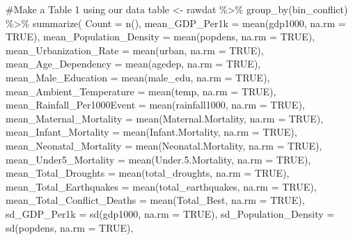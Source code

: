 \documentclass[
  letterpaper,
  DIV=11,
  numbers=noendperiod]{scrartcl}
\newenvironment{Shaded}{\begin{snugshade}}{\end{snugshade}}
\newcommand{\AttributeTok}[1]{\textcolor[rgb]{0.40,0.45,0.13}{#1}}
\newcommand{\CommentTok}[1]{\textcolor[rgb]{0.37,0.37,0.37}{#1}}
\newcommand{\ConstantTok}[1]{\textcolor[rgb]{0.56,0.35,0.01}{#1}}
\newcommand{\FloatTok}[1]{\textcolor[rgb]{0.68,0.00,0.00}{#1}}
\newcommand{\FunctionTok}[1]{\textcolor[rgb]{0.28,0.35,0.67}{#1}}
\newcommand{\NormalTok}[1]{\textcolor[rgb]{0.00,0.23,0.31}{#1}}
\newcommand{\OtherTok}[1]{\textcolor[rgb]{0.00,0.23,0.31}{#1}}
\newcommand{\SpecialCharTok}[1]{\textcolor[rgb]{0.37,0.37,0.37}{#1}}
\begin{document}
\begin{Shaded}
\begin{Highlighting}[]
\CommentTok{\#Make a Table 1 using our data}
\NormalTok{table }\OtherTok{\textless{}{-}}\NormalTok{ rawdat }\SpecialCharTok{\%\textgreater{}\%} 
  \FunctionTok{group\_by}\NormalTok{(bin\_conflict) }\SpecialCharTok{\%\textgreater{}\%} 
  \FunctionTok{summarize}\NormalTok{(}
    \AttributeTok{Count =} \FunctionTok{n}\NormalTok{(),}
    \AttributeTok{mean\_GDP\_Per1k =} \FunctionTok{mean}\NormalTok{(gdp1000, }\AttributeTok{na.rm =} \ConstantTok{TRUE}\NormalTok{),}
    \AttributeTok{mean\_Population\_Density =} \FunctionTok{mean}\NormalTok{(popdens, }\AttributeTok{na.rm =} \ConstantTok{TRUE}\NormalTok{),}
    \AttributeTok{mean\_Urbanization\_Rate =} \FunctionTok{mean}\NormalTok{(urban, }\AttributeTok{na.rm =} \ConstantTok{TRUE}\NormalTok{),}
    \AttributeTok{mean\_Age\_Dependency =} \FunctionTok{mean}\NormalTok{(agedep, }\AttributeTok{na.rm =} \ConstantTok{TRUE}\NormalTok{),}
    \AttributeTok{mean\_Male\_Education =} \FunctionTok{mean}\NormalTok{(male\_edu, }\AttributeTok{na.rm =} \ConstantTok{TRUE}\NormalTok{),}
    \AttributeTok{mean\_Ambient\_Temperature =} \FunctionTok{mean}\NormalTok{(temp, }\AttributeTok{na.rm =} \ConstantTok{TRUE}\NormalTok{),}
    \AttributeTok{mean\_Rainfall\_Per1000Event =} \FunctionTok{mean}\NormalTok{(rainfall1000, }\AttributeTok{na.rm =} \ConstantTok{TRUE}\NormalTok{),}
    \AttributeTok{mean\_Maternal\_Mortality =} \FunctionTok{mean}\NormalTok{(Maternal.Mortality, }\AttributeTok{na.rm =} \ConstantTok{TRUE}\NormalTok{),}
    \AttributeTok{mean\_Infant\_Mortality =} \FunctionTok{mean}\NormalTok{(Infant.Mortality, }\AttributeTok{na.rm =} \ConstantTok{TRUE}\NormalTok{),}
    \AttributeTok{mean\_Neonatal\_Mortality =} \FunctionTok{mean}\NormalTok{(Neonatal.Mortality, }\AttributeTok{na.rm =} \ConstantTok{TRUE}\NormalTok{),}
    \AttributeTok{mean\_Under5\_Mortality =} \FunctionTok{mean}\NormalTok{(Under.}\FloatTok{5.}\NormalTok{Mortality, }\AttributeTok{na.rm =} \ConstantTok{TRUE}\NormalTok{),}
    \AttributeTok{mean\_Total\_Droughts =} \FunctionTok{mean}\NormalTok{(total\_droughts, }\AttributeTok{na.rm =} \ConstantTok{TRUE}\NormalTok{),}
    \AttributeTok{mean\_Total\_Earthquakes =} \FunctionTok{mean}\NormalTok{(total\_earthquakes, }\AttributeTok{na.rm =} \ConstantTok{TRUE}\NormalTok{),}
    \AttributeTok{mean\_Total\_Conflict\_Deaths =} \FunctionTok{mean}\NormalTok{(Total\_Best, }\AttributeTok{na.rm =} \ConstantTok{TRUE}\NormalTok{),}
    \AttributeTok{sd\_GDP\_Per1k =} \FunctionTok{sd}\NormalTok{(gdp1000, }\AttributeTok{na.rm =} \ConstantTok{TRUE}\NormalTok{),}
    \AttributeTok{sd\_Population\_Density =} \FunctionTok{sd}\NormalTok{(popdens, }\AttributeTok{na.rm =} \ConstantTok{TRUE}\NormalTok{),}

\end{Highlighting}
\end{Shaded}
\end{document}
